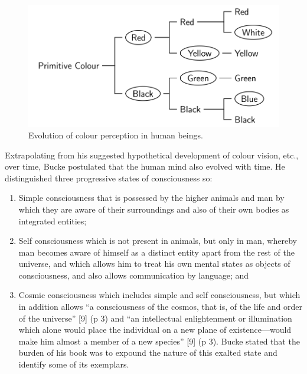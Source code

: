 \documentclass[
  11pt,
  a4paper,
]{article}
\begin{document}
\begin{figure}
\hypertarget{fig:colour-tree}{%
\centering
\includegraphics[width=1\textwidth,height=\textheight]{images/colour-perception-tree.svg}
\caption[Evolution of colour perception in human beings.]{Evolution of
colour perception in human
beings.\footnotemark{}}\label{fig:colour-tree}
}
\end{figure}

Extrapolating from his suggested hypothetical development of colour
vision, etc., over time, Bucke postulated that the human mind also
evolved with time. He distinguished three progressive states of
consciousness so:

\begin{enumerate}
\item
  Simple consciousness that is possessed by the higher animals and man
  by which they are aware of their surroundings and also of their own
  bodies as integrated entities;
\item
  Self consciousness which is not present in animals, but only in man,
  whereby man becomes aware of himself as a distinct entity apart from
  the rest of the universe, and which allows him to treat his own mental
  states as objects of consciousness, and also allows communication by
  language; and
\item
  Cosmic consciousness which includes simple and self consciousness, but
  which in addition allows ``a consciousness of the cosmos, that is, of
  the life and order of the universe'' {[}9{]} (p 3) and ``an
  intellectual enlightenment or illumination which alone would place the
  individual on a new plane of existence---would make him almost a
  member of a new species'' {[}9{]} (p 3). Bucke stated that the burden
  of his book was to expound the nature of this exalted state and
  identify some of its exemplars.
\end{enumerate}
\end{document}
